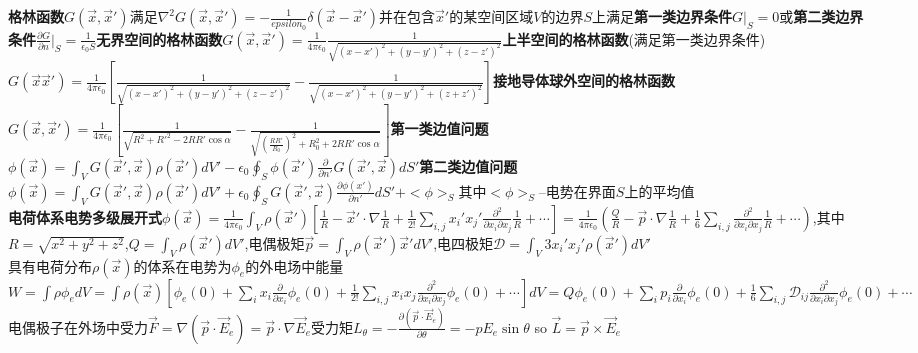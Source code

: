 \documentclass[10pt,a4paper]{article}
\begin{document}
\begin{multicols}{2}
\textbf{格林函数}$G(\vec{x},\vec{x}')$满足$\nabla^2G(\vec{x},\vec{x}')=-\frac{1}{epsilon_0}\delta(\vec{x}-\vec{x}')$并在包含$\vec{x}'$的某空间区域$V$的边界$S$上满足\textbf{第一类边界条件}$G|_S=0$或\textbf{第二类边界条件}$\frac{\partial G}{\partial n}|_S=\frac{1}{\epsilon_0S}$\textbf{无界空间的格林函数}$G(\vec{x},\vec{x}')=\frac{1}{4\pi\epsilon_0}\frac{1}{\sqrt{(x-x')^2+(y-y')^2+(z-z')^2}}$\textbf{上半空间的格林函数}(满足第一类边界条件)$G(\vec{x}\vec{x}')=\frac{1}{4\pi\epsilon_0}[\frac{1}{\sqrt{(x-x')^2+(y-y')^2+(z-z')^2}}-\frac{1}{\sqrt{(x-x')^2+(y-y')^2+(z+z')^2}}]$\textbf{接地导体球外空间的格林函数}$G(\vec{x},\vec{x}')=\frac{1}{4\pi\epsilon_0}[\frac{1}{\sqrt{R^2+R'^2-2RR'\cos\alpha}}-\frac{1}{\sqrt{(\frac{RR'}{R_0})^2+R_0^2+2RR'\cos\alpha}}]$\textbf{第一类边值问题}$\phi(\vec{x})=\int_VG(\vec{x}',\vec{x})\rho(\vec{x}')dV'-\epsilon_0\oint_S\phi(\vec{x}')\frac{\partial}{\partial n'}G(\vec{x}',\vec{x})dS'$\textbf{第二类边值问题}$\phi(\vec{x})=\int_VG(\vec{x}',\vec{x})\rho(\vec{x}')dV'+\epsilon_0\oint_SG(\vec{x}',\vec{x})\frac{\partial\phi(x')}{\partial n'}dS'+<\phi>_S$其中$<\phi>_S$--电势在界面$S$上的平均值\\
\textbf{电荷体系电势多级展开式}$\phi(\vec{x})=\frac{1}{4\pi\epsilon_0}\int_V\rho(\vec{x}')[\frac{1}{R}-\vec{x}'\cdot\nabla\frac{1}{R}+\frac{1}{2!}\sum_{i,j}x_i'x_j'\frac{\partial^2}{\partial x_i\partial x_j}\frac{1}{R}+\cdots]=\frac{1}{4\pi\epsilon_0}(\frac{Q}{R}-\vec{p}\cdot\nabla\frac{1}{R}+\frac{1}{6}\sum_{i,j}\frac{\partial^2}{\partial x_i\partial x_j}\frac{1}{R}+\cdots)$,其中$R=\sqrt{x^2+y^2+z^2}$,$Q=\int_V\rho(\vec{x}')dV'$,电偶极矩$\vec{p}=\int_V\rho(\vec{x}')\vec{x}'dV'$,电四极矩$\mathscr{D}=\int_V3x_i'x_j'\rho(\vec{x}')dV'$\\
具有电荷分布$\rho(\vec{x})$的体系在电势为$\phi_e$的外电场中能量$W=\int\rho\phi_edV=\int\rho(\vec{x})[\phi_e(0)+\sum_ix_i\frac{\partial}{\partial x_i}\phi_e(0)+\frac{1}{2!}\sum_{i,j}x_ix_j\frac{\partial^2}{\partial x_i\partial x_j}\phi_e(0)+\cdots]dV=Q\phi_e(0)+\sum_ip_i\frac{\partial}{\partial x_i}\phi_e(0)+\frac{1}{6}\sum_{i,j}\mathscr{D}_{ij}\frac{\partial^2}{\partial x_i\partial x_j}\phi_e(0)+\cdots$电偶极子在外场中受力$\vec{F}=\nabla(\vec{p}\cdot\vec{E}_e)=\vec{p}\cdot\nabla\vec{E}_e$受力矩$L_{\theta}=-\frac{\partial(\vec{p}\cdot\vec{E}_e)}{\partial\theta}=-pE_e\sin\theta$ so $\vec{L}=\vec{p}\times\vec{E}_e$
\end{multicols}
\end{document}
